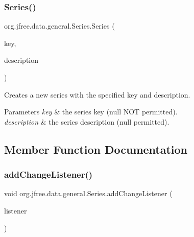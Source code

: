 \subsubsection{\texorpdfstring{Series()}{Series()}\hspace{0.1cm}{\footnotesize\ttfamily [2/2]}}
{\footnotesize\ttfamily org.\+jfree.\+data.\+general.\+Series.\+Series (\begin{DoxyParamCaption}\item[{Comparable}]{key,  }\item[{String}]{description }\end{DoxyParamCaption})\hspace{0.3cm}{\ttfamily [protected]}}

Creates a new series with the specified key and description.


\begin{DoxyParams}{Parameters}
{\em key} & the series key ({\ttfamily null} N\+OT permitted). \\
\hline
{\em description} & the series description ({\ttfamily null} permitted). \\
\hline
\end{DoxyParams}


\subsection{Member Function Documentation}
\mbox{\label{classorg_1_1jfree_1_1data_1_1general_1_1_series_a904ebb4fe8d0dacca7ec8c9a2f272a75}} 
\subsubsection{\texorpdfstring{add\+Change\+Listener()}{addChangeListener()}}
{\footnotesize\ttfamily void org.\+jfree.\+data.\+general.\+Series.\+add\+Change\+Listener (\begin{DoxyParamCaption}\item[{\mbox{\hyperlink{interfaceorg_1_1jfree_1_1data_1_1general_1_1_series_change_listener}{Series\+Change\+Listener}}}]{listener }\end{DoxyParamCaption})}

